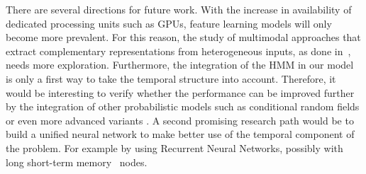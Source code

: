 There are several directions for future work. With the increase in availability of dedicated processing units such as GPUs, feature learning models will only become more prevalent. For this reason, the study of multimodal approaches that extract complementary representations from heterogeneous inputs, as done in~\cite{neverova2014moddrop}, needs more exploration.
Furthermore, the integration of the HMM in our model is only a first way to take the temporal structure into account. Therefore, it would be interesting to verify whether the performance can be improved further by the integration of other probabilistic models such as conditional random fields or even more advanced variants \cite{wang2006hidden}. A second promising research path would be to build a unified neural network to make better use of the temporal component of the problem. For example by using Recurrent Neural Networks, possibly with long short-term memory~\cite{graves2009novel} nodes.



\endinput
